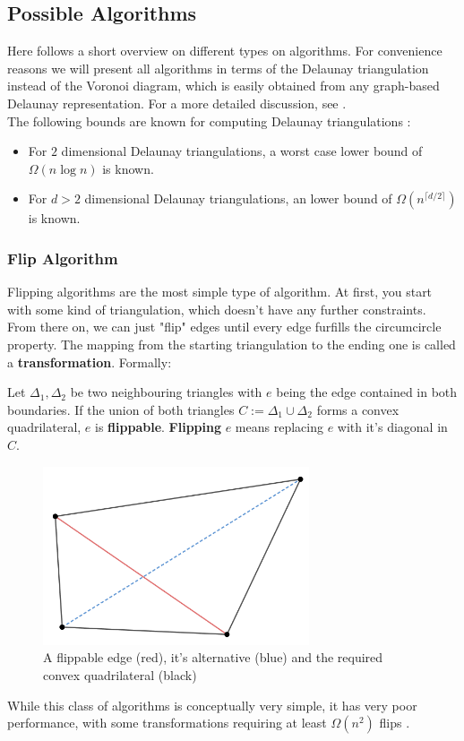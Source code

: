 \subsection{Possible Algorithms}
Here follows a short overview on different types on algorithms. For convenience reasons we will present all algorithms in terms of the Delaunay triangulation instead of the Voronoi diagram, which is easily obtained from any graph-based Delaunay representation. For a more detailed discussion, see \cite{FORTUNE1995}.\\
The following bounds are known for computing Delaunay triangulations \cite{FORTUNE1995}:
\begin{itemize}
    \item For $2$ dimensional Delaunay triangulations, a worst case lower bound of $\Omega(n \log n)$ is known.
    \item For $d > 2$ dimensional Delaunay triangulations, an lower bound of $\Omega(n^{\lceil d/2 \rceil})$ is known.
\end{itemize}
\subsubsection{Flip Algorithm}
Flipping algorithms are the most simple type of algorithm. At first, you start with some kind of triangulation, which doesn't have any further constraints. From there on, we can just "flip" edges until every edge furfills the circumcircle property. The mapping from the starting triangulation to the ending one is called a \textbf{transformation}. Formally:
\begin{theorem}
Let $\Delta_1, \Delta_2$ be two neighbouring triangles with $e$ being the edge contained in both boundaries. If the union of both triangles $C := \Delta_1 \cup \Delta_2$ forms a convex quadrilateral, $e$ is \textbf{flippable}. \textbf{Flipping} $e$ means replacing $e$ with it's diagonal in $C$.
\end{theorem}
\begin{figure}[H]
    \centering
    \includegraphics[width=0.7\textwidth]{flippable.png}
    \caption{A flippable edge (red), it's alternative (blue) and the required convex quadrilateral (black)}
    \label{fig:my_label}
\end{figure}
While this class of algorithms is conceptually very simple, it has very poor performance, with some transformations requiring at least $\Omega(n^2)$ flips \cite{Hurtado1999}.
